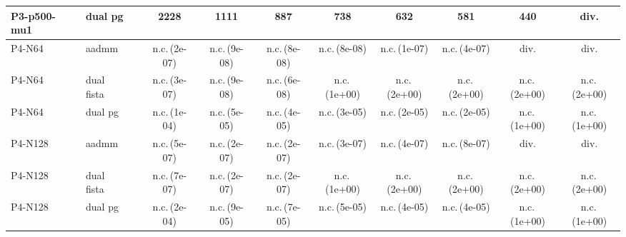 \begin{tabular}{llrcccccccc}
P3-p500-mu1 & dual pg & & 2228 & 1111 & 887 & 738 & 632 & 581 & 440 & div.\\
\midrule
P4-N64 & aadmm & & n.c.\,(2e-07) & n.c.\,(9e-08) & n.c.\,(8e-08) & n.c.\,(8e-08) & n.c.\,(1e-07) & n.c.\,(4e-07) & div. & div.\\
P4-N64 & dual fista & & n.c.\,(3e-07) & n.c.\,(9e-08) & n.c.\,(6e-08) & n.c.\,(1e+00) & n.c.\,(2e+00) & n.c.\,(2e+00) & n.c.\,(2e+00) & n.c.\,(2e+00)\\
P4-N64 & dual pg & & n.c.\,(1e-04) & n.c.\,(5e-05) & n.c.\,(4e-05) & n.c.\,(3e-05) & n.c.\,(2e-05) & n.c.\,(2e-05) & n.c.\,(1e+00) & n.c.\,(1e+00)\\
\midrule
P4-N128 & aadmm & & n.c.\,(5e-07) & n.c.\,(2e-07) & n.c.\,(2e-07) & n.c.\,(3e-07) & n.c.\,(4e-07) & n.c.\,(8e-07) & div. & div.\\
P4-N128 & dual fista & & n.c.\,(7e-07) & n.c.\,(2e-07) & n.c.\,(2e-07) & n.c.\,(1e+00) & n.c.\,(2e+00) & n.c.\,(2e+00) & n.c.\,(2e+00) & n.c.\,(2e+00)\\
P4-N128 & dual pg & & n.c.\,(2e-04) & n.c.\,(9e-05) & n.c.\,(7e-05) & n.c.\,(5e-05) & n.c.\,(4e-05) & n.c.\,(4e-05) & n.c.\,(1e+00) & n.c.\,(1e+00)\\
\bottomrule
\end{tabular}
